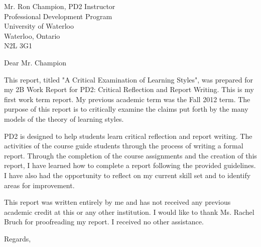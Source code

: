 \documentclass[12pt]{letter}
\begin{document}
\begin{letter}
{Mr. Ron Champion, PD2 Instructor\\
Professional Development Program\\
University of Waterloo\\
Waterloo, Ontario\\
N2L 3G1}

\opening{Dear Mr. Champion}

This report, titled "A Critical Examination of Learning Styles", was prepared
for my 2B Work Report for PD2: Critical Reflection and Report Writing. This is
my first work term report. My previous academic term was the Fall 2012 term. The
purpose of this report is to critically examine the claims put forth by the many
models of the theory of learning styles.

PD2 is designed to help students learn critical reflection and report writing.
The activities of the course guide students through the process of writing a
formal report. Through the completion of the course assignments and the creation
of this report, I have learned how to complete a report following the provided
guidelines. I have also had the opportunity to reflect on my current skill set
and to identify areas for improvement.

This report was written entirely by me and has not received any previous
academic credit at this or any other institution. I would like to thank Ms.
Rachel Bruch for proofreading my report. I received no other assistance.

\closing{Regards,}
\end{letter}
\end{document}
